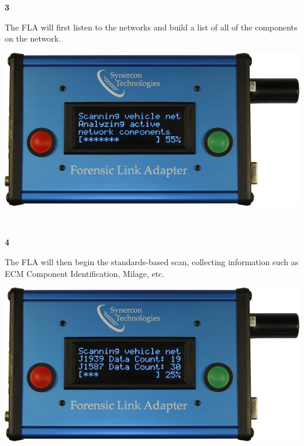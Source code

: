 \documentclass[11pt, oneside]{book}
\begin{document}
\noindent\begin{minipage}{0.45\textwidth}%
\begin{center}
\textbf{3}\\[\baselineskip]
\end{center}
The FLA will first listen to the
networks and build a list of all
of the components on the network.
\end{minipage}%
\hfill%
\begin{minipage}{0.45\textwidth}
\includegraphics[width=\linewidth]{../media/fla_screens/ethernet_and_others/veh_scan/analyzing_55}
\end{minipage}
\\[\baselineskip]
\noindent\begin{minipage}{0.45\textwidth}%
\begin{center}
\textbf{4}\\[\baselineskip]
\end{center}
The FLA will then begin the standards-based scan, collecting information such as ECM Component Identification, Milage, etc.
\end{minipage}%
\hfill%
\begin{minipage}{0.45\textwidth}
\includegraphics[width=\linewidth]{../media/fla_screens/ethernet_and_others/veh_scan/scan_25}
\end{minipage}
\end{document}
